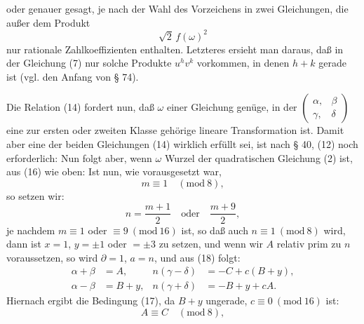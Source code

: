 
oder genauer gesagt, je nach der Wahl des Vorzeichens in zwei Gleichungen, die außer dem Produkt
\[
\sqrt{2}\, f(\omega)^2
\]
nur rationale Zahlkoeffizienten enthalten. Letzteres ersieht man daraus, daß in der Gleichung (7) nur solche Produkte $u^h v^k$ vorkommen, in denen $h+k$ gerade ist (vgl. den Anfang von § 74).

Die Relation (14) fordert nun, daß $\omega$ einer Gleichung
genüge, in der $\begin{pmatrix} \alpha, & \beta \\ \gamma, & \delta \end{pmatrix}$ eine zur ersten oder zweiten Klasse gehörige lineare Transformation ist. Damit aber eine der beiden Gleichungen (14) wirklich erfüllt sei, ist nach § 40, (12) noch erforderlich:
Nun folgt aber, wenn $\omega$ Wurzel der quadratischen Gleichung (2) ist, aus (16) wie oben:
Ist nun, wie vorausgesetzt war,
\[
m \equiv 1 \quad (\mathrm{mod}\ 8),
\]
so setzen wir:
\[
n = \frac{m+1}{2} \quad \text{oder} \quad \frac{m+9}{2},
\]
je nachdem $m \equiv 1$ oder $\equiv 9\ (\mathrm{mod}\ 16)$ ist, so daß auch $n \equiv 1\ (\mathrm{mod}\ 8)$ wird, dann ist $x = 1$, $y = \pm 1$ oder $= \pm 3$ zu setzen, und wenn wir $A$ relativ prim zu $n$ voraussetzen, so wird $\partial = 1$, $a = n$, und aus (18) folgt: %
\[
\begin{aligned}
\alpha + \beta &= A, & n(\gamma - \delta) &= -C + c(B+y), \\
\alpha - \beta &= B + y, & n(\gamma + \delta) &= -B + y + cA.
\end{aligned}
\]
Hiernach ergibt die Bedingung (17), da $B+y$ ungerade, $c \equiv 0\ (\mathrm{mod}\ 16)$ ist:
\[
A \equiv C \quad (\mathrm{mod}\ 8),
\]

